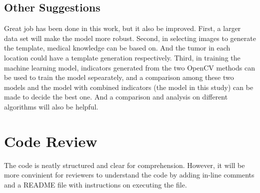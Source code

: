 \documentclass[twoside,11pt]{article}
\begin{document}
\subsection{Other Suggestions}
Great job has been done in this work, but it also be improved. First, a larger data set will make the model more robust. Second, in selecting images to generate the template, medical knowledge can be based on. And the tumor in each location could have a template generation respectively. Third, in training the machine learning model, indicators generated from the two OpenCV methods can be used to train the model sepearately, and a comparison among these two models and the model with combined indicators (the model in this study) can be made to decide the best one. And a comparison and analysis on different algorithms will also be helpful.

\section{Code Review}
The code is neatly structured and clear for comprehension. However, it will be more convinient for reviewers to understand the code by adding in-line comments and a README file with instructions on executing the file.
\end{document}
